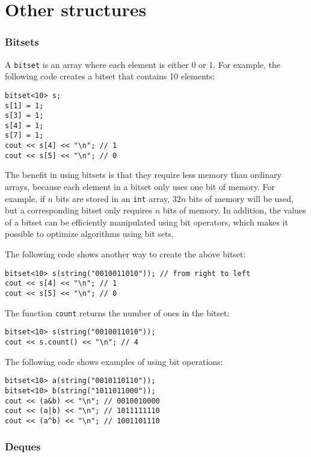 \section{Other structures}

\subsubsection{Bitsets}


A \texttt{bitset} is an array
where each element is either 0 or 1.
For example, the following code creates
a bitset that contains 10 elements:
\begin{lstlisting}
bitset<10> s;
s[1] = 1;
s[3] = 1;
s[4] = 1;
s[7] = 1;
cout << s[4] << "\n"; // 1
cout << s[5] << "\n"; // 0
\end{lstlisting}

The benefit in using bitsets is that
they require less memory than ordinary arrays,
because each element in a bitset only
uses one bit of memory.
For example, 
if $n$ bits are stored in an \texttt{int} array,
$32n$ bits of memory will be used,
but a corresponding bitset only requires $n$ bits of memory.
In addition, the values of a bitset
can be efficiently manipulated using
bit operators, which makes it possible to
optimize algorithms using bit sets.

The following code shows another way to create the above bitset:
\begin{lstlisting}
bitset<10> s(string("0010011010")); // from right to left
cout << s[4] << "\n"; // 1
cout << s[5] << "\n"; // 0
\end{lstlisting}

The function \texttt{count} returns the number
of ones in the bitset:

\begin{lstlisting}
bitset<10> s(string("0010011010"));
cout << s.count() << "\n"; // 4
\end{lstlisting}

The following code shows examples of using bit operations:
\begin{lstlisting}
bitset<10> a(string("0010110110"));
bitset<10> b(string("1011011000"));
cout << (a&b) << "\n"; // 0010010000
cout << (a|b) << "\n"; // 1011111110
cout << (a^b) << "\n"; // 1001101110
\end{lstlisting}

\subsubsection{Deques}

